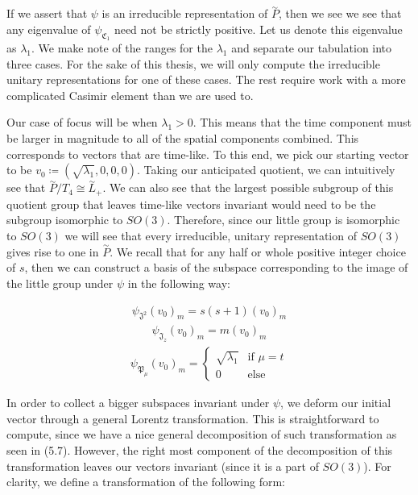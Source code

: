 If we assert that $\psi$ is an irreducible representation of $\overset{\sim}{P}$, then we see we see that any eigenvalue of $\psi_{\mathfrak{C}_1}$ need not be strictly positive. Let us denote this eigenvalue as $\lambda_1$. We make note of the ranges for the $\lambda_1$ and separate our tabulation into three cases. For the sake of this thesis, we will only compute the irreducible unitary representations for one of these cases. The rest require work with a more complicated Casimir element than we are used to.

Our case of focus will be when $\lambda_1 > 0$. This means that the time component must be larger in magnitude to all of the spatial components combined. This corresponds to vectors that are time-like. To this end, we pick our starting vector to be $v_0 \coloneq (\sqrt{\lambda_1},0,0,0)$. Taking our anticipated quotient, we can intuitively see that $\overset{\sim}{P}/T_4 \cong \overset{\sim}{L}_+$. We can also see that the largest possible subgroup of this quotient group that leaves time-like vectors invariant would need to be the subgroup isomorphic to $SO(3)$. Therefore, since our little group is isomorphic to $SO(3)$ we will see that every irreducible, unitary representation of $SO(3)$ gives rise to one in $\overset{\sim}{P}$. We recall that for any half or whole positive integer choice of $s$, then we can construct a basis of the subspace corresponding to the image of the little group under $\psi$ in the following way:

\begin{equation}
\begin{aligned}
	\psi_{\mathfrak{J}^2} (v_0)_m = s(s+1)(v_0)_m
\end{aligned}
\end{equation}
\begin{equation}
\begin{aligned}
	\psi_{\mathfrak{J}_z} (v_0)_m = m(v_0)_m
\end{aligned}
\end{equation}
\begin{equation}
\begin{aligned}
	\psi_{\mathfrak{P}_\mu} (v_0)_m = \begin{cases}
										\sqrt{\lambda_1} & \text{if } \mu=t\\
										0 & \text{else}
										\end{cases}
\end{aligned}
\end{equation}

In order to collect a bigger subspaces invariant under $\psi$, we deform our initial vector through a general Lorentz transformation. This is straightforward to compute, since we have a nice general decomposition of such transformation as seen in (5.7). However, the right most component of the decomposition of this transformation leaves our vectors invariant (since it is a part of $SO(3)$). For clarity, we define a transformation of the following form:

